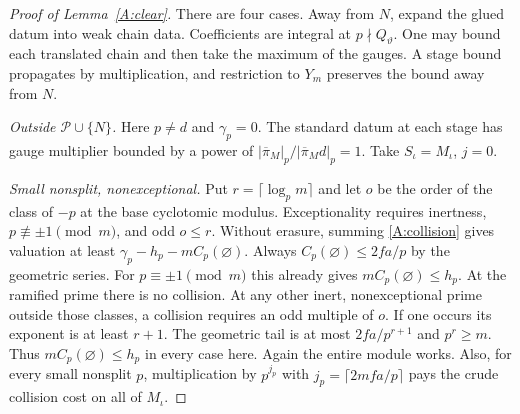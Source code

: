 \begin{proof}[Proof of Lemma~\ref{A:clear}]
There are four cases. Away from $N$, expand the glued datum into weak chain data. Coefficients are integral at $p\nmid Q_\vartheta$. One may bound each translated chain and then take the maximum of the gauges. A stage bound propagates by multiplication, and restriction to $Y_m$ preserves the bound away from $N$.

\emph{Outside $\mathcal P\cup\{N\}$.} Here $p\ne d$ and $\gamma_p=0$. The standard datum at each stage has gauge multiplier bounded by a power of $|\overline\pi_M|_p/|\overline\pi_M d|_p=1$. Take $S_\iota=M_\iota$, $j=0$.

\emph{Small nonsplit, nonexceptional.} Put $r=\lceil\log_p m\rceil$ and let $o$ be the order of the class of $-p$ at the base cyclotomic modulus. Exceptionality requires inertness, $p\not\equiv\pm1\pmod m$, and odd $o\le r$. Without erasure, summing \eqref{A:collision} gives valuation at least $\gamma_p-h_p-m C_p(\varnothing)$. Always $C_p(\varnothing)\le 2fa/p$ by the geometric series. For $p\equiv\pm1\pmod m$ this already gives $mC_p(\varnothing)\le h_p$. At the ramified prime there is no collision. At any other inert, nonexceptional prime outside those classes, a collision requires an odd multiple of $o$. If one occurs its exponent is at least $r+1$. The geometric tail is at most $2fa/p^{r+1}$ and $p^r\ge m$. Thus $m C_p(\varnothing)\le h_p$ in every case here. Again the entire module works. Also, for every small nonsplit $p$, multiplication by $p^{j_p}$ with $j_p=\lceil 2mfa/p\rceil$ pays the crude collision cost on all of $M_\iota$.


\end{proof}
